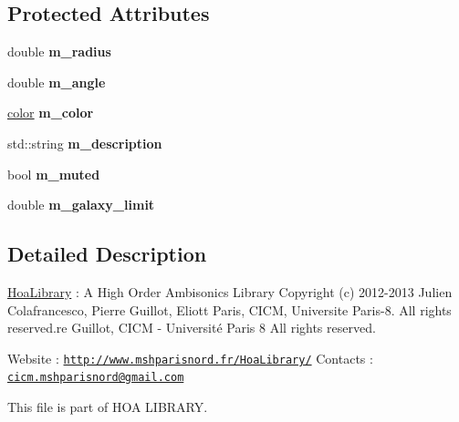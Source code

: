 \subsection*{Protected Attributes}
\begin{DoxyCompactItemize}
\item 
\hypertarget{class_star_a687d043aec32f3851a6d07cb37bd5f60}{double {\bfseries m\-\_\-radius}}\label{class_star_a687d043aec32f3851a6d07cb37bd5f60}

\item 
\hypertarget{class_star_ac60a93823c3e79224202fd0e77654a83}{double {\bfseries m\-\_\-angle}}\label{class_star_ac60a93823c3e79224202fd0e77654a83}

\item 
\hypertarget{class_star_abd432e9947bf22fdd6dce0449017be00}{\hyperlink{structcolor}{color} {\bfseries m\-\_\-color}}\label{class_star_abd432e9947bf22fdd6dce0449017be00}

\item 
\hypertarget{class_star_a2b9dcdf04555f124c7730c2f2eedbbe2}{std\-::string {\bfseries m\-\_\-description}}\label{class_star_a2b9dcdf04555f124c7730c2f2eedbbe2}

\item 
\hypertarget{class_star_a8fdf5f31524c641c2a976be91104f3d2}{bool {\bfseries m\-\_\-muted}}\label{class_star_a8fdf5f31524c641c2a976be91104f3d2}

\item 
\hypertarget{class_star_a8bb66e389333e5ae54bb90264d87e043}{double {\bfseries m\-\_\-galaxy\-\_\-limit}}\label{class_star_a8bb66e389333e5ae54bb90264d87e043}

\end{DoxyCompactItemize}


\subsection{Detailed Description}
\hyperlink{interface_hoa_library}{Hoa\-Library} \-: A High Order Ambisonics Library Copyright (c) 2012-\/2013 Julien Colafrancesco, Pierre Guillot, Eliott Paris, C\-I\-C\-M, Universite Paris-\/8. All rights reserved.\-re Guillot, C\-I\-C\-M -\/ Université Paris 8 All rights reserved.

Website \-: \href{http://www.mshparisnord.fr/HoaLibrary/}{\tt http\-://www.\-mshparisnord.\-fr/\-Hoa\-Library/} Contacts \-: \href{mailto:cicm.mshparisnord@gmail.com}{\tt cicm.\-mshparisnord@gmail.\-com}

This file is part of H\-O\-A L\-I\-B\-R\-A\-R\-Y.


